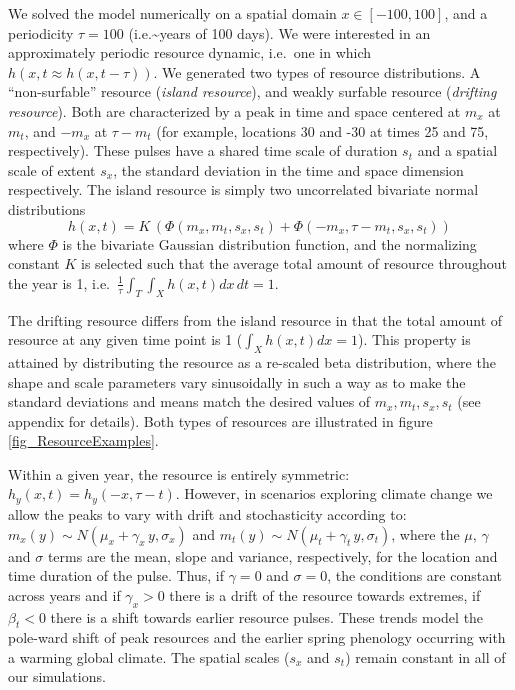 \documentclass[utf8]{frontiersSCNS} %
\begin{document}
We solved the model numerically on a spatial domain $x \in [-100,100]$, and a periodicity $\tau = 100$ (i.e.\textasciitilde years of 100 days). We were interested in an approximately periodic resource dynamic, i.e.~one in which $h(x,t \approx h(x, t-\tau))$. We generated two types of resource distributions. A ``non-surfable'' resource (\emph{island resource}), and weakly surfable resource (\emph{drifting resource}). Both are characterized by a peak in time and space centered at $m_x$ at $m_t$, and $-m_x$ at $\tau - m_t$ (for example, locations 30 and -30 at times 25 and 75, respectively). These pulses have a shared time scale of duration $s_t$ and a spatial scale of extent $s_x$, the standard deviation in the time and space dimension respectively. The island resource is simply two uncorrelated bivariate normal
distributions 
$$h(x,t) = K\,(\Phi(m_x, m_t, s_x, s_t) + \Phi(-m_x, \tau - m_t, s_x, s_t))$$ 
\noindent where $\Phi$ is the bivariate Gaussian distribution function, and the normalizing constant $K$ is selected such that the average total amount of resource throughout the year is 1, i.e.~$\frac{1}{\tau} \int_T\int_X h(x,t) dx\,dt = 1$.

The drifting resource differs from the island resource in that the total amount of resource at any given time point is 1 ($\int_X h(x,t) dx = 1$). This property is attained by distributing the resource as a re-scaled beta distribution, where the shape and scale parameters vary sinusoidally in such a way as to make the standard deviations and means match the desired values of $m_x, m_t, s_x, s_t$ (see appendix for details). Both types of resources are illustrated in figure \ref{fig_ResourceExamples}.

Within a given year, the resource is entirely symmetric: $h_y(x,t) = h_y(-x, \tau-t)$. However, in scenarios exploring climate change we allow the peaks to vary with drift and stochasticity according to: $m_x(y) \sim {N}(\mu_x + \gamma_x\,y, \sigma_x)$ and $m_t(y) \sim {N}(\mu_t + \gamma_t\,y, \sigma_t)$, where the $\mu$, $\gamma$ and $\sigma$ terms are the mean, slope and variance, respectively, for the location and time duration of the pulse. Thus, if $\gamma=0$ and $\sigma=0$, the conditions are constant across years and if $\gamma_x > 0$ there is a drift of the resource towards extremes, if $\beta_t < 0$ there is a shift towards earlier resource pulses. These trends model the pole-ward shift of peak resources and the earlier spring phenology occurring with a warming global climate. The spatial scales ($s_x$ and $s_t$) remain constant in all of our simulations. 
\end{document}
